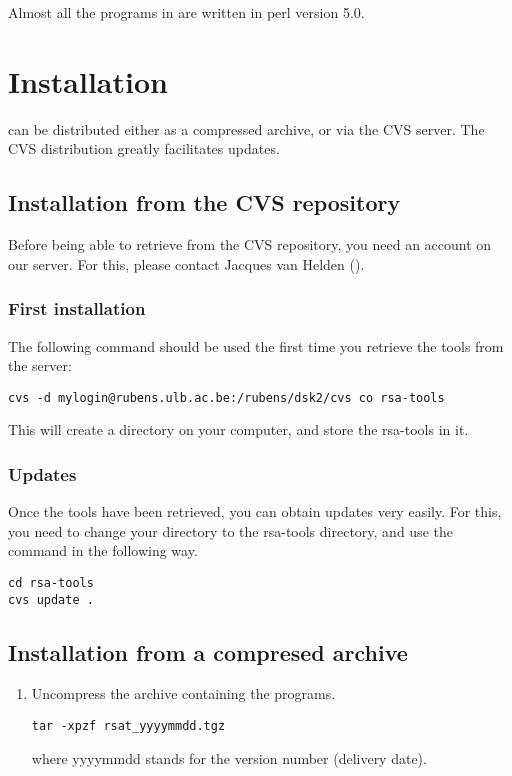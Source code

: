 \documentclass{article}
\begin{document}
Almost all the programs in \RSAT are written in perl version 5.0. 

\section{Installation}

\RSAT can be distributed either as a compressed archive, or via the CVS
server. The CVS distribution greatly facilitates updates.

\subsection{Installation from the CVS repository}

Before being able to retrieve \RSAT from the CVS repository, you need
an account on our server. For this, please contact Jacques van Helden
().

\subsubsection{First installation}

The following command should be used the first time you retrieve the
tools from the server:
\begin{verbatim}
cvs -d mylogin@rubens.ulb.ac.be:/rubens/dsk2/cvs co rsa-tools
\end{verbatim}

This will create a directory  on your computer, and
store the rsa-tools in it.

\subsubsection{Updates}

Once the tools have been retrieved, you can obtain updates very
easily. For this, you need to change your directory to the rsa-tools
directory, and use the  command in the following way.

\begin{verbatim}
cd rsa-tools
cvs update .
\end{verbatim}

\subsection{Installation from a compresed archive}

\begin{enumerate}

\item Uncompress the archive containing the programs. 
\begin{verbatim}
tar -xpzf rsat_yyyymmdd.tgz
\end{verbatim}

where yyyymmdd stands for the version number (delivery date).

\end{enumerate}
\end{document}
